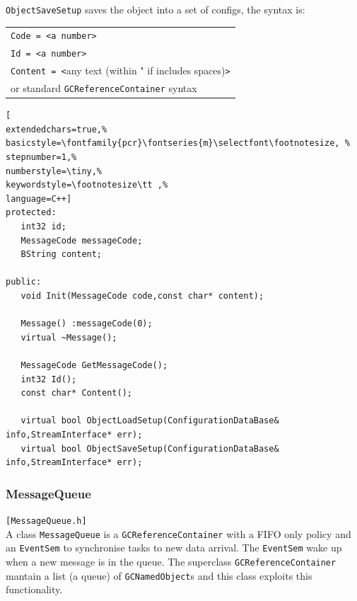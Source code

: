 \noindent \texttt{ObjectSaveSetup} saves the object into a set of configs, the syntax is:
\begin{table}[!h]
  \begin{tabular}{l}
\texttt{Code = <a number>} \\
\texttt{Id = <a number>} \\
\texttt{Content = <}any text (within " if includes spaces)\texttt{>} \\
or standard \texttt{GCReferenceContainer} syntax \\
  \end{tabular}
\end{table}

\begin{lstlisting}[
extendedchars=true,%
basicstyle=\fontfamily{pcr}\fontseries{m}\selectfont\footnotesize, %
stepnumber=1,%
numberstyle=\tiny,%
keywordstyle=\footnotesize\tt ,%
language=C++]
protected:
   int32 id;
   MessageCode messageCode;
   BString content;

public:
   void Init(MessageCode code,const char* content);

   Message() :messageCode(0);
   virtual ~Message();

   MessageCode GetMessageCode();
   int32 Id();
   const char* Content();

   virtual bool ObjectLoadSetup(ConfigurationDataBase& info,StreamInterface* err);
   virtual bool ObjectSaveSetup(ConfigurationDataBase& info,StreamInterface* err);
\end{lstlisting}



\subsubsection{MessageQueue}
\texttt{[MessageQueue.h]}\\
A class \texttt{MessageQueue} is a \texttt{GCReferenceContainer} with a FIFO only policy and an \texttt{EventSem} to synchronise tasks to new data arrival. The \texttt{EventSem} wake up when a new message is in the queue.
The superclass \texttt{GCReferenceContainer} mantain a list (a queue) of \texttt{GCNamedObject}s and this class exploits this functionality. \\


